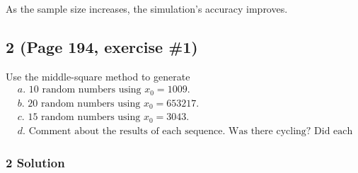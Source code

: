 \documentclass[]{article}
\begin{document}
As the sample size increases, the simulation's accuracy improves.

\hypertarget{page-194-exercise-1}{%
\subsection{2 (Page 194, exercise \#1)}\label{page-194-exercise-1}}

Use the middle-square method to generate \begin{align*}
&a. \text{ 10 random numbers using } x_0 = 1009.\\
&b. \text{ 20 random numbers using } x_0 = 653217.\\
&c. \text{ 15 random numbers using } x_0 = 3043.\\
&d. \text{ Comment about the results of each sequence. Was there cycling? Did each sequence degenerate rapidly?}
\end{align*}

\hypertarget{solution-1}{%
\subsubsection{2 Solution}\label{solution-1}}
\end{document}
